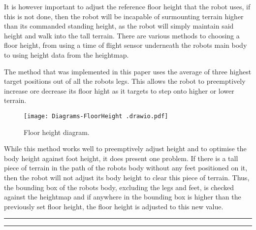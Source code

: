     It is however important to adjust the reference floor height that the robot uses, if this is not done, then the robot will be
    incapable of surmounting terrain higher than its commanded standing height, as the robot will simply maintain said height and walk into the tall terrain.
    There are various methods to choosing a floor height, from using 
    a time of flight sensor underneath the robots main body to using height data from the heightmap.

    The method that was implemented in this paper uses the average of three highest target positions out of all the robots legs.
    This allows the robot to preemptively increase ore decrease its floor hight as it targets to step onto higher or lower terrain.

    \begin{figure}[h]
        \centering
        \texttt{[image: Diagrams-FloorHeight .drawio.pdf]}
        \caption{Floor height diagram.}
        \label{fig:floor_height}
    \end{figure}

    While this method works well to preemptively adjust height and to optimise the body height against foot height, it does present one problem. If there is a tall piece of terrain in the path of the robots body
    without any feet positioned on it, then the robot will not adjust its body height to clear this piece of terrain. 
    Thus, the bounding box of the robots body, excluding the legs and feet, is checked against the heightmap
    and if anywhere in the bounding box is higher than the previously set floor height, the floor height is adjusted to this new value.


\bigskip
\bigskip
\hrule
\smallbreak
\hrule